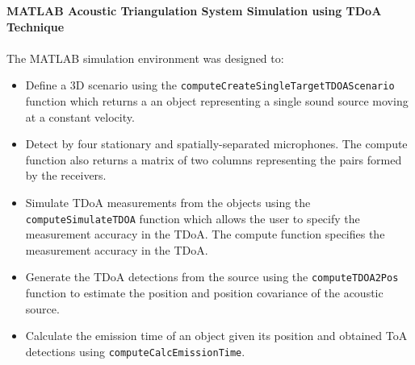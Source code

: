 \documentclass[a4paper,11pt]{article}
\begin{document}
\textbf{MATLAB Acoustic Triangulation System Simulation using TDoA Technique}\\\\
The MATLAB simulation environment was designed to:
\begin{itemize}
	\item
	Define a 3D scenario using the \texttt{computeCreateSingleTargetTDOAScenario} function which returns a an object representing a single sound source moving at a constant velocity.
	\item 
	Detect by four stationary and spatially-separated microphones. The compute function also returns a matrix of two columns representing the pairs formed by the receivers.
	\item 
	Simulate TDoA measurements from the objects using the \texttt{computeSimulateTDOA} function which allows the user to specify the measurement accuracy in the TDoA. The compute function specifies the measurement accuracy in the TDoA.
	\item 
	Generate the TDoA detections from the source using the \texttt{computeTDOA2Pos} function to estimate the position and position covariance of the acoustic source. 
	\item 
	Calculate the emission time of an object given its position and obtained ToA detections using \texttt{computeCalcEmissionTime}.
\end{itemize}
\end{document}
